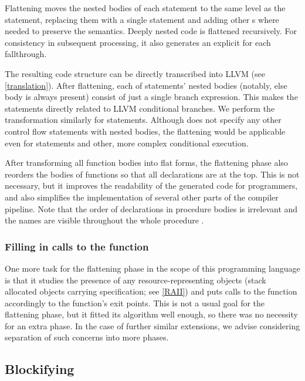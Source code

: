 Flattening moves the nested bodies of each  statement to the same level as the  statement, replacing them with a single  statement and adding other s where needed to preserve the semantics. Deeply nested code is flattened recursively. For consistency in subsequent processing, it also generates an explicit  for each fallthrough.

The resulting code structure can be directly transcribed into LLVM (see \cref{translation}). After flattening, each of  statements' nested bodies (notably, else body is always present) consist of just a single branch expression. This makes the  statements directly related to LLVM conditional branches. We perform the transformation similarly for  statements. Although \cmm{} does not specify any other control flow statements with nested bodies, the flattening would be applicable even for  statements and other, more complex conditional execution.

After transforming all function bodies into flat forms, the flattening phase also reorders the bodies of functions so that all declarations are at the top. This is not necessary, but it improves the readability of the generated code for programmers, and also simplifies the implementation of several other parts of the compiler pipeline. Note that the order of declarations in procedure bodies is irrelevant and the names are visible throughout the whole procedure \cite{ramsey2005c}.

\subsubsection{Filling in calls to the  function}

One more task for the flattening phase in the scope of this programming language is that it studies the presence of any resource-representing objects (stack allocated objects carrying  specification; see \cref{RAII}) and puts calls to the  function accordingly to the function's exit points. This is not a usual goal for the flattening phase, but it fitted its algorithm well enough, so there was no necessity for an extra phase. In the case of further similar extensions, we advise considering separation of such concerns into more phases.

\subsection{Blockifying}
\label{sec:blockify}

